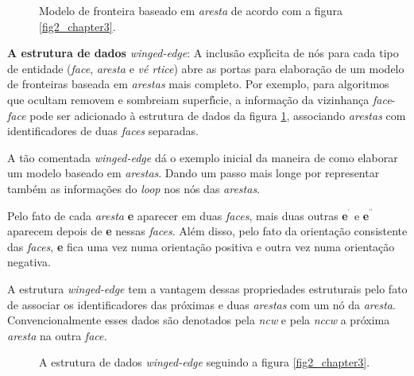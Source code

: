 \documentclass[12pt,a4paper]{book}
\begin{document}
\begin{figure}[htbp]
  \begin{center}
    \leavevmode
    
    \caption{Modelo de fronteira baseado em \textit{aresta} de acordo com a figura \ref{fig2_chapter3}.}  
    \label{fig4_chapter3}
  \end{center}
\end{figure}


\textbf{A estrutura de dados} \textit{winged-edge}: A inclus\~{a}o expl\'{\i}cita de
n\'{o}s para cada tipo de entidade (\textit{face}, \textit{aresta} e \textit{v\'{e}%
rtice}) abre as portas para elabora\c{c}\~{a}o de um modelo de fronteiras
baseada em \textit{arestas} mais completo. Por exemplo, para algoritmos
que ocultam removem e sombreiam superf\'{\i}cie, a informa\c{c}\~{a}o da
vizinhan\c{c}a \textit{face}-\textit{face} pode ser adicionado \`{a} estrutura
de dados da figura \ref{fig4_chapter3}, associando \textit{arestas} com
identificadores de duas \textit{faces} separadas.

A t\~{a}o comentada \textit{winged-edge} d\'{a} o exemplo inicial
da maneira de como elaborar um modelo baseado em \textit{arestas}. Dando um
passo mais longe por representar tamb\'{e}m as informa\c{c}\~{o}es do \textit{loop}
nos n\'{o}s das \textit{arestas}.

Pelo fato de cada \textit{aresta} \textbf{e }aparecer em duas \textit{faces},
mais duas outras \textbf{e}$^{^{\prime }}$ e \textbf{e}$^{^{\prime \prime }}$
aparecem depois de \textbf{e }nessas \textit{faces}. Al\'{e}m disso, pelo fato
da orienta\c{c}\~{a}o consistente das \emph{faces}, \textbf{e }fica uma vez
numa orienta\c{c}\~{a}o positiva e outra vez numa orienta\c{c}\~{a}o
negativa.

A estrutura \textit{winged-edge} tem a vantagem dessas propriedades
estruturais pelo fato de associar os identificadores das pr\'{o}ximas e duas 
\textit{arestas} com um n\'{o} da \textit{aresta}. Convencionalmente esses dados
s\~{a}o denotados pela \textit{ncw} e pela \textit{nccw} a pr\'{o}xima \textit{%
aresta} na outra \textit{face.}

\begin{figure}[htbp]
  \begin{center}
    \leavevmode
    
    \caption{A estrutura de dados \textit{winged-edge} seguindo a figura \ref{fig2_chapter3}.}  
    \label{fig5_chapter3}
  \end{center}
\end{figure}
\end{document}
